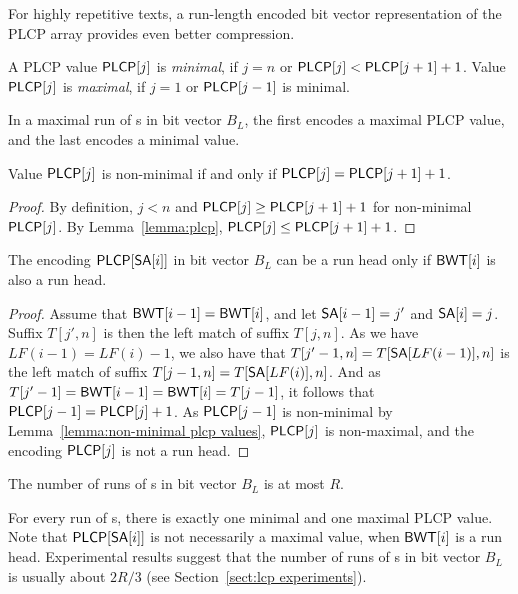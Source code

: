 For highly repetitive texts, a run-length encoded bit vector representation of the PLCP array provides even better compression.

\begin{definition}\label{def:minimal plcp values}
A PLCP value $\mathsf{PLCP}[j]$ is \emph{minimal}, if $j = n$ or $\mathsf{PLCP}[j] < \mathsf{PLCP}[j+1] + 1$. Value $\mathsf{PLCP}[j]$ is \emph{maximal}, if $j = 1$ or $\mathsf{PLCP}[j-1]$ is minimal.
\end{definition}

In a maximal run of \onebit{}s in bit vector $B_{L}$, the first \onebit{} encodes a maximal PLCP value, and the last \onebit{} encodes a minimal value.

\begin{lemma}\label{lemma:non-minimal plcp values}
Value $\mathsf{PLCP}[j]$ is non-minimal if and only if $\mathsf{PLCP}[j] = \mathsf{PLCP}[j+1] + 1$.
\end{lemma}

\begin{proof}
By definition, $j < n$ and $\mathsf{PLCP}[j] \ge \mathsf{PLCP}[j+1] + 1$ for non-minimal $\mathsf{PLCP}[j]$. By Lemma~\ref{lemma:plcp}, $\mathsf{PLCP}[j] \le \mathsf{PLCP}[j+1] + 1$.
\end{proof}

\begin{lemma}\label{lemma:plcp run heads}
The \onebit{} encoding $\mathsf{PLCP}[\mathsf{SA}[i]]$ in bit vector $B_{L}$ can be a run head only if $\mathsf{BWT}[i]$ is also a run head.
\end{lemma}

\begin{proof}
Assume that $\mathsf{BWT}[i-1] = \mathsf{BWT}[i]$, and let $\mathsf{SA}[i-1] = j'$ and $\mathsf{SA}[i] = j$. Suffix $T[j',n]$ is then the left match of suffix $T[j,n]$. As we have $LF(i-1) = LF(i) - 1$, we also have that $T[j'-1,n] = T[\mathsf{SA}[LF(i-1)],n]$ is the left match of suffix $T[j-1,n] = T[\mathsf{SA}[LF(i)], n]$. And as $T[j'-1] = \mathsf{BWT}[i-1] = \mathsf{BWT}[i] = T[j-1]$, it follows that $\mathsf{PLCP}[j-1] = \mathsf{PLCP}[j] + 1$. As $\mathsf{PLCP}[j-1]$ is non-minimal by Lemma~\ref{lemma:non-minimal plcp values}, $\mathsf{PLCP}[j]$ is non-maximal, and the \onebit{} encoding $\mathsf{PLCP}[j]$ is not a run head.
\end{proof}

\begin{corollary}\label{corollary:plcp runs}
The number of runs of \onebit{}s in bit vector $B_{L}$ is at most $R$.
\end{corollary}

For every run of \onebit{}s, there is exactly one minimal and one maximal PLCP value. Note that $\mathsf{PLCP}[\mathsf{SA}[i]]$ is not necessarily a maximal value, when $\mathsf{BWT}[i]$ is a run head. Experimental results suggest that the number of runs of \onebit{}s in bit vector $B_{L}$ is usually about $2R/3$ (see Section~\ref{sect:lcp experiments}).

